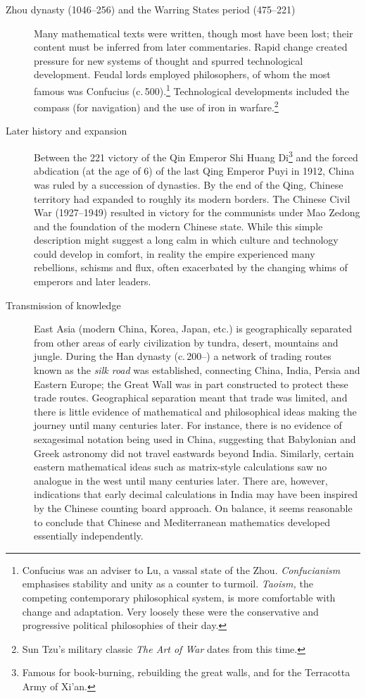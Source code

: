 \begin{description}
  \item[Zhou dynasty (1046--256\BC) and the Warring States period (475--221\BC)] Many mathematical texts were written, though most have been lost; their content must be inferred from later commentaries. Rapid change created pressure for new systems of thought and spurred technological development. Feudal lords employed philosophers, of whom the most famous was Confucius (c.\,500\BC).\footnote{%
  Confucius was an adviser to Lu, a vassal state of the Zhou. \emph{Confucianism} emphasises stability and unity as a counter to turmoil. \emph{Taoism,} the competing contemporary philosophical system, is more comfortable with change and adaptation. Very loosely these were the conservative and progressive political philosophies of their day.%
 } Technological developments included the compass (for navigation) and the use of iron in warfare.\footnote{%
 		Sun Tzu's military classic \emph{The Art of War} dates from this time.%
	}
  
  \item[Later history and expansion] Between the 221\BC{} victory of the Qin Emperor Shi Huang Di\footnote{%
  	Famous for book-burning, rebuilding the great walls, and for the Terracotta Army of Xi'an.%
 	} and the forced abdication (at the age of 6) of the last Qing Emperor Puyi in 1912, China was ruled by a succession of dynasties. By the end of the Qing, Chinese territory had expanded to roughly its modern borders. The Chinese Civil War (1927--1949) resulted in victory for the communists under Mao Zedong and the foundation of the modern Chinese state. While this simple description might suggest a long calm in which culture and technology could develop in comfort, in reality the empire experienced many rebellions, schisms and flux, often exacerbated by the changing whims of emperors and later leaders.
  
  \item[Transmission of knowledge] East Asia (modern China, Korea, Japan, etc.) is geographically separated from other areas of early civilization by tundra, desert, mountains and jungle. During the Han dynasty (c.\,200\BC--) a network of trading routes known as the \emph{silk road} was established, connecting China, India, Persia and Eastern Europe; the Great Wall was in part constructed to protect these trade routes. Geographical separation meant that trade was limited, and there is little evidence of mathematical and philosophical ideas making the journey until many centuries later. For instance, there is no evidence of sexagesimal notation being used in China, suggesting that Babylonian and Greek astronomy did not travel eastwards beyond India. Similarly, certain eastern mathematical ideas such as matrix-style calculations saw no analogue in the west until many centuries later. There are, however, indications that early decimal calculations in India may have been inspired by the Chinese counting board approach. On balance, it seems reasonable to conclude that Chinese and Mediterranean mathematics developed essentially independently.
\end{description}

